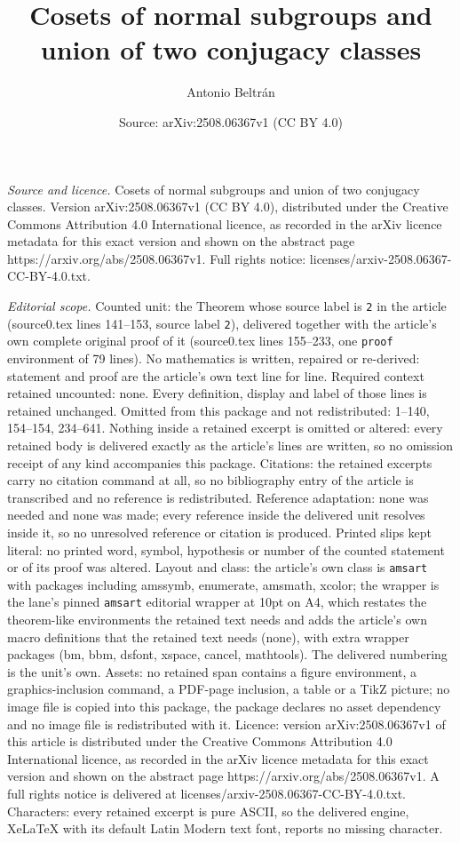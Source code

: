 \documentclass[10pt,a4paper]{amsart}
\title[Cosets of normal subgroups and union of two conjugacy classe]{Cosets of normal subgroups and union of two conjugacy classes}
\author{Antonio Beltr\'an}
\date{Source: arXiv:2508.06367v1 (CC BY 4.0)}
\begin{document}
\maketitle

\noindent\emph{Source and licence.} Cosets of normal subgroups and union of two conjugacy classes. Version arXiv:2508.06367v1 (CC BY 4.0), distributed under the Creative Commons Attribution 4.0 International licence, as recorded in the arXiv licence metadata for this exact version and shown on the abstract page https://arxiv.org/abs/2508.06367v1. Full rights notice: licenses/arxiv-2508.06367-CC-BY-4.0.txt.\par\smallskip

\noindent\textit{Editorial scope.} Counted unit: the Theorem whose source label is \texttt{2} in the article (source0.tex lines 141--153, source label \texttt{2}), delivered together with the article's own complete original proof of it (source0.tex lines 155--233, one \texttt{proof} environment of 79 lines). No mathematics is written, repaired or re-derived: statement and proof are the article's own text line for line. Required context retained uncounted: none. Every definition, display and label of those lines is retained unchanged. Omitted from this package and not redistributed: 1--140, 154--154, 234--641. Nothing inside a retained excerpt is omitted or altered: every retained body is delivered exactly as the article's lines are written, so no omission receipt of any kind accompanies this package. Citations: the retained excerpts carry no citation command at all, so no bibliography entry of the article is transcribed and no reference is redistributed. Reference adaptation: none was needed and none was made; every reference inside the delivered unit resolves inside it, so no unresolved reference or citation is produced. Printed slips kept literal: no printed word, symbol, hypothesis or number of the counted statement or of its proof was altered. Layout and class: the article's own class is \texttt{amsart} with packages including amssymb, enumerate, amsmath, xcolor; the wrapper is the lane's pinned \texttt{amsart} editorial wrapper at 10pt on A4, which restates the theorem-like environments the retained text needs and adds the article's own macro definitions that the retained text needs (none), with extra wrapper packages (bm, bbm, dsfont, xspace, cancel, mathtools). The delivered numbering is the unit's own. Assets: no retained span contains a figure environment, a graphics-inclusion command, a PDF-page inclusion, a table or a TikZ picture; no image file is copied into this package, the package declares no asset dependency and no image file is redistributed with it. Licence: version arXiv:2508.06367v1 of this article is distributed under the Creative Commons Attribution 4.0 International licence, as recorded in the arXiv licence metadata for this exact version and shown on the abstract page https://arxiv.org/abs/2508.06367v1. A full rights notice is delivered at licenses/arxiv-2508.06367-CC-BY-4.0.txt. Characters: every retained excerpt is pure ASCII, so the delivered engine, XeLaTeX with its default Latin Modern text font, reports no missing character.
\end{document}
